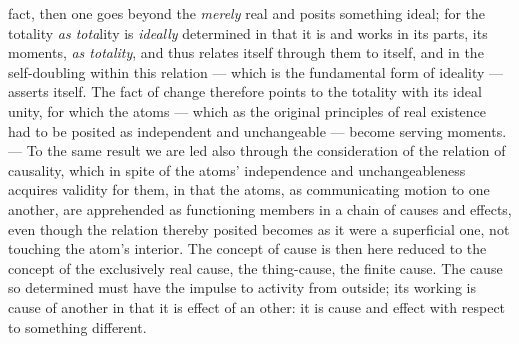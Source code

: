 \documentclass[12pt,a4paper]{book}
\begin{document}
fact, then one goes beyond the \emph{merely} real and posits something ideal;
for the totality \emph{as tota}lity is \emph{ideally} determined in that it is
and works in its parts, its moments, \emph{as totality}, and thus relates
itself through them to itself, and in the self-doubling within this relation
--- which is the fundamental form of ideality --- asserts itself. The fact of
change therefore points to the totality with its ideal unity, for which the
atoms --- which as the original principles of real existence had to be posited
as independent and unchangeable --- become serving moments. --- To the same
result we are led also through the consideration of the relation of causality,
which in spite of the atoms' independence and unchangeableness acquires
validity for them, in that the atoms, as communicating motion to one another,
are apprehended as functioning members in a chain of causes and effects, even
though the relation thereby posited becomes as it were a superficial one, not
touching the atom's interior. The concept of cause is then here reduced to the
concept of the exclusively real cause, the thing-cause, the finite cause. The
cause so determined must have the impulse to activity from outside; its
working is cause of another in that it is effect of an
other: it is cause and effect with respect to something different.
\end{document}
